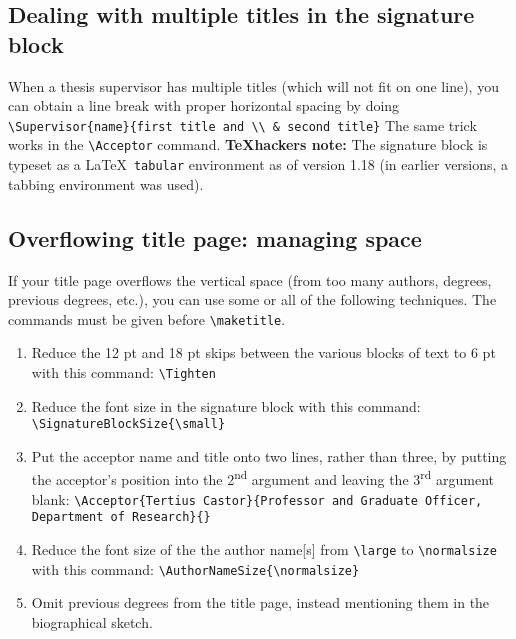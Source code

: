 \documentclass[11pt]{article}
\begin{document}
\subsection{Dealing with multiple titles in the signature block}\label{sec:6.3}
When a thesis supervisor has multiple titles (which will not fit on one line), you can obtain a line break with proper horizontal spacing by doing
	\vskip 5pt
	\quad\verb|\Supervisor{name}{first title and \\ & second title}|
	\vskip 5pt
\noindent The same trick works in the \verb|\Acceptor| command.
\textbf{\TeX hackers note:} The signature block is typeset as a \LaTeX\ \texttt{tabular} environment as of version 1.18 (in earlier versions, a tabbing environment was used).

\subsection{Overflowing title page: managing space} If your title page overflows the vertical space (from too many authors, degrees, previous degrees, etc.), you can use some or all of the following techniques. The commands must be given before \verb|\maketitle|.
\begin{enumerate}
 \item Reduce the 12 pt and 18 pt skips between the various blocks of text to 6 pt with this command:
	\vskip 5pt
	\noindent\verb|\Tighten|
 \item Reduce the font size in the signature block with this command:
	\vskip 5pt
	\noindent\verb|\SignatureBlockSize{\small}| 
 \item Put the acceptor name and title onto two lines, rather than three, by putting the acceptor's position into the 2\textsuperscript{nd} argument and leaving the 3\textsuperscript{rd} argument blank:
	\vskip 5pt
	{\small\noindent\verb|\Acceptor{Tertius Castor}{Professor and Graduate Officer, Department of Research}{}|}
 \item Reduce the font size of the the author name[s] from \verb|\large| to \verb|\normalsize| with this command:
	\vskip 5pt
	\noindent\verb|\AuthorNameSize{\normalsize}|
 \item Omit previous degrees from the title page, instead mentioning them in the biographical sketch.
\end{enumerate}
\end{document}
